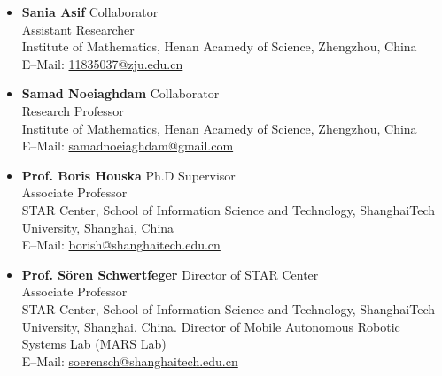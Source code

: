 \documentclass[paper=a4,fontsize=11pt]{scrartcl} %
\newcommand{\NewPart}[1]{\section*{\uppercase{#1}}}
\begin{document}
\begin{itemize}
	\item \textbf{Sania Asif} {\hfill Collaborator}\\
Assistant Researcher \\Institute of Mathematics, Henan Acamedy of Science, Zhengzhou, China \\
E--Mail: \url{11835037@zju.edu.cn}

	\item \textbf{Samad Noeiaghdam} {\hfill Collaborator}\\
Research Professor \\Institute of Mathematics, Henan Acamedy of Science, Zhengzhou, China \\
E--Mail: \url{samadnoeiaghdam@gmail.com}


	\item \textbf{Prof. Boris Houska} {\hfill Ph.D Supervisor}\\
Associate Professor\\ STAR Center, School of Information Science and
Technology, ShanghaiTech University, Shanghai, China\\
E--Mail: \url{borish@shanghaitech.edu.cn}

	\item \textbf{Prof. S\"oren Schwertfeger} {\hfill Director of STAR Center}\\
Associate Professor\\ STAR Center, School of Information Science and
Technology, ShanghaiTech University, Shanghai, China. Director of Mobile Autonomous Robotic Systems Lab (MARS Lab)\\
E--Mail: \url{soerensch@shanghaitech.edu.cn}
\end{itemize}
\vspace{5cm}
\end{document}
